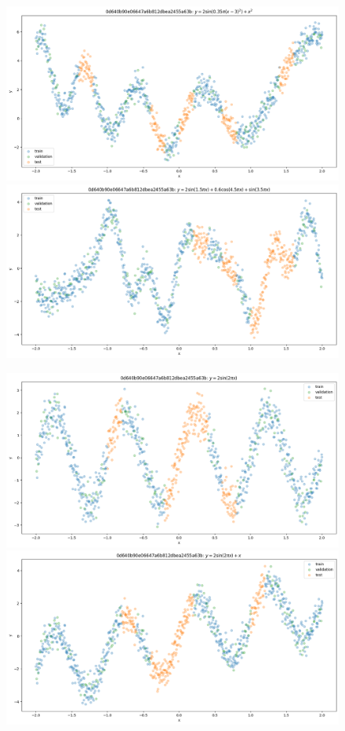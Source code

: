 \documentclass{article}
\numberwithin{equation}{section}
\begin{document}
\begin{figure}[h!]
\centering
\begin{minipage}{.49\textwidth}
  \centering
  \includegraphics[width=\linewidth]{thesis-report/figures/toy_curves/data/curve0/data.png}
  \includegraphics[width=\linewidth]{thesis-report/figures/toy_curves/data/curve3/data.png}
\end{minipage}%
\begin{minipage}{.49\textwidth}
  \centering
  \includegraphics[width=\linewidth]{thesis-report/figures/toy_curves/data/curve1/data.png}
  \includegraphics[width=\linewidth]{thesis-report/figures/toy_curves/data/curve4/data.png}

\end{minipage}
\end{figure}
\end{document}
